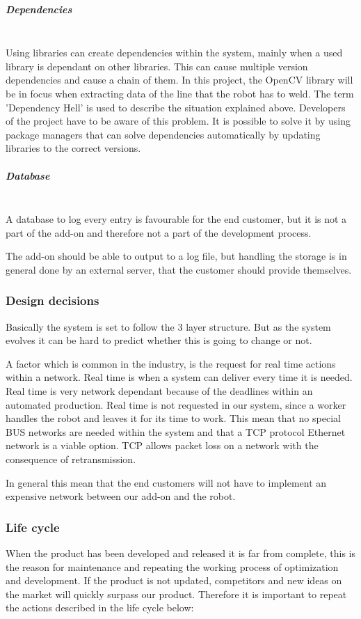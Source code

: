 \subparagraph*{Dependencies}~\\
Using libraries can create dependencies within the system, mainly when a used library is dependant on other libraries. This can cause multiple version dependencies and cause a chain of them. In this project, the OpenCV library will be in focus when extracting data of the line that the robot has to weld. The term 'Dependency Hell' is used to describe the situation explained above. Developers of the project have to be aware of this problem. It is possible to solve it by using package managers that can solve dependencies automatically by updating libraries to the correct versions. 

\subparagraph*{Database}~\\
A database to log every entry is favourable for the end customer, but it is not a part of the add-on and therefore not a part of the development process.

The add-on should be able to output to a log file, but handling the storage is in general done by an external server, that the customer should provide themselves.

\subsubsection{Design decisions}
Basically the system is set to follow the 3 layer structure. But as the system evolves it can be hard to predict whether this is going to change or not. 

A factor which is common in the industry, is the request for real time actions within a network. Real time is when a system can deliver every time it is needed. Real time is very network dependant because of the deadlines within an automated production. 
Real time is not requested in our system, since a worker handles the robot and leaves it for its time to work. This mean that no special BUS networks are needed within the system and that a TCP protocol Ethernet network is a viable option. TCP allows packet loss on a network with the consequence of retransmission.

In general this mean that the end customers will not have to implement an expensive network between our add-on and the robot. 

\subsubsection{Life cycle}

When the product has been developed and released it is far from complete, this is the reason for maintenance and repeating the working process of optimization and development. If the product is not updated, competitors and new ideas on the market will quickly surpass our product. Therefore it is important to repeat the actions described in the life cycle below:
\clearpage

